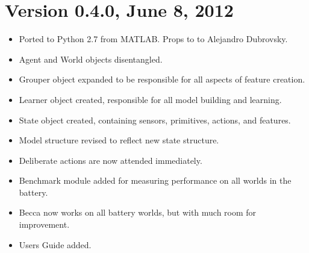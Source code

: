 \section*{Version 0.4.0, June 8, 2012}

\begin{itemize}
\item Ported to Python 2.7 from MATLAB. Props to to Alejandro Dubrovsky.
\item Agent and World objects disentangled.
\item Grouper object expanded to be responsible for all aspects of feature creation.
\item Learner object created, responsible for all model building and learning.
\item State object created, containing sensors, primitives, actions, and features.
\item Model structure revised to reflect new state structure.
\item Deliberate actions are now attended immediately.
\item Benchmark module added for measuring performance on all worlds in the battery.
\item Becca now works on all battery worlds, but with much room for improvement.
\item Users Guide added. 
\end{itemize}

